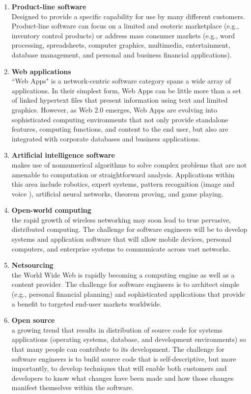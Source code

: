 \documentclass{article}
\begin{document}
\begin{enumerate}[label=\arabic*)]
		\item \textbf{Product-line software} \\
			Designed to provide a specific capability for use by many different customers.
			Product-line software can focus on a limited and esoteric marketplace (e.g., inventory control
			products) or address mass  consumer markets (e.g., word processing, spreadsheets, computer graphics,
			multimedia, entertainment, database management, and personal and business financial applications).

		\item \textbf{Web applications} \\
			``Web Apps" is a network-centric software category spans a wide array of applications.
			In their simplest form, Web Apps can be little more than a set of linked hypertext files that
			present information using text and limited graphics.
			However, as Web 2.0 emerges, Web Apps are evolving into sophisticated computing environments that
			not only provide standalone features, computing functions, and content to the end user, but also are
			integrated with corporate databases and business applications.

		\item \textbf{Artificial intelligence software} \\
			makes use of nonnumerical algorithms to solve complex problems that are not amenable to computation
			or straightforward analysis.
			Applications within this area include robotics, expert systems, pattern recognition (image and voice
			), artificial neural networks, theorem proving, and game playing.

		\item \textbf{Open-world computing} \\
			the rapid growth of wireless networking may soon lead to true pervasive, distributed computing.
			The challenge for software engineers will be to develop systems and application software that will
			allow mobile devices, personal computers, and enterprise systems to communicate across vast
			networks.

		\item \textbf{Netsourcing} \\
			the World Wide Web is rapidly becoming a computing engine as well as a content provider.
			The challenge for software engineers is to architect simple (e.g., personal financial planning) and
			sophisticated applications that provide a benefit to targeted end-user markets worldwide.

		\item \textbf{Open source} \\
			a growing trend that results in distribution of source code for systems applications (operating
			systems, database, and development environments) so that many people can contribute to its
			development.
			The challenge for software engineers is to build source code that is self-descriptive, but more
			importantly, to develop techniques that will enable both customers and developers to know what
			changes have been made and how those changes manifest themselves within the software.
	\end{enumerate}
\end{document}
